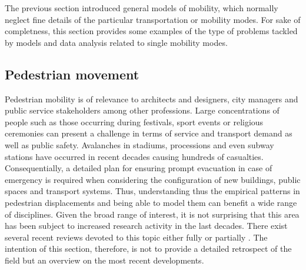 

The previous section introduced general models of mobility, which normally neglect fine details of the particular transportation or mobility modes. For sake of completness, this section provides some examples of the type of problems tackled by models and data analysis related to single mobility modes.


\subsection{Pedestrian movement}

Pedestrian mobility is of relevance to architects and designers, city managers and public service stakeholders among other professions. Large concentrations of people such as those occurring during festivals, sport events or religious ceremonies can present a challenge in terms of service and transport demand as well as public safety. Avalanches in stadiums, processions and even subway stations have occurred in recent decades \cite{helbing_2013_pedestrian} causing hundreds of casualties. Consequentially, a detailed plan for ensuring prompt evacuation in case of emergency is required when considering the configuration of new buildings, public spaces and transport systems. Thus, understanding thus the empirical patterns in pedestrian displacements and being able to model them can benefit a wide range of disciplines. Given the broad range of interest, it is not surprising that this area has been subject to increased research activity in the last decades. There exist several recent reviews devoted to this topic either fully or partially \cite{helbing_2013_pedestrian,helbing_2001_traffic,zainuddin_2010_characteristics,vicsek_2012_collective,benenson_2014_ten,cao_2015_cyber}. The intention of this section, therefore, is not to provide a detailed retrospect of the field but an overview on the most recent developments. 

